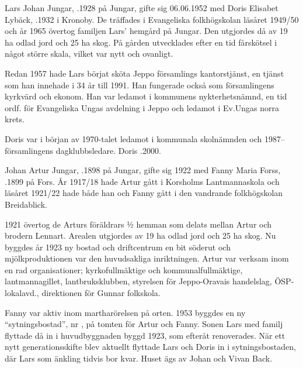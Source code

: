 Lars Johan Jungar, .1928 på Jungar, gifte sig 06.06.1952 med Doris Elisabet Lybäck, .1932 i Kronoby. De träffades i Evangeliska folkhögskolan läsåret 1949/50 och år 1965 övertog familjen Lars' hemgård på Jungar. Den utgjordes då av 19 ha odlad jord och 25 ha skog. På gården utvecklades efter en tid fårskötsel i något större skala, vilket var nytt och ovanligt.

Redan 1957 hade Lars börjat sköta Jeppo församlings kantorstjänst, en tjänst som han innehade i 34 år till 1991. Han fungerade också som församlingens kyrkvärd och ekonom. Han var ledamot i kommunens nykterhetsnämnd, en tid ordf. för Evangeliska Ungas avdelning i Jeppo och ledamot i Ev.Ungas norra krets.

Doris var i början av 1970-talet ledamot i kommunala skolnämnden och 1987-- församlingens dagklubbsledare. Doris .2000.
\begin{jhchildren}
  \item {}
  \item {}
  \item {}
\end{jhchildren}


Johan Artur Jungar, .1898 på Jungar, gifte sig 1922  med Fanny Maria Forss, .1899 på Fors.
År 1917/18 hade Artur gått i Korsholms Lantmannaskola och läsåret 1921/22 hade både han och Fanny gått i den vandrande folkhögskolan Breidablick.

1921 övertog de Arturs föräldrars ½  hemman som delats mellan Artur och brodern Lennart. Arealen utgjordes av 19 ha odlad jord och 25 ha skog. Nu byggdes år 1923 ny bostad och driftcentrum en bit söderut och mjölkproduktionen var den huvudsakliga inriktningen. Artur var verksam inom en rad organisationer; kyrkofullmäktige och kommunalfullmäktige, lantmannagillet, lantbruksklubben, styrelsen för Jeppo-Oravais handelslag, ÖSP-lokalavd., direktionen för Gunnar folkskola.

Fanny var aktiv inom martharörelsen på orten. 1953 byggdes en ny ``sytningsbostad'', nr , på tomten för Artur och Fanny. Sonen Lars med familj flyttade då in i huvudbyggnaden byggd 1923, som efteråt renoverades. När ett nytt generationsskifte blev aktuellt flyttade Lars och Doris in i sytningsbostaden, där Lars som änkling tidvis bor kvar. Huset ägs av Johan och Vivan Back.

